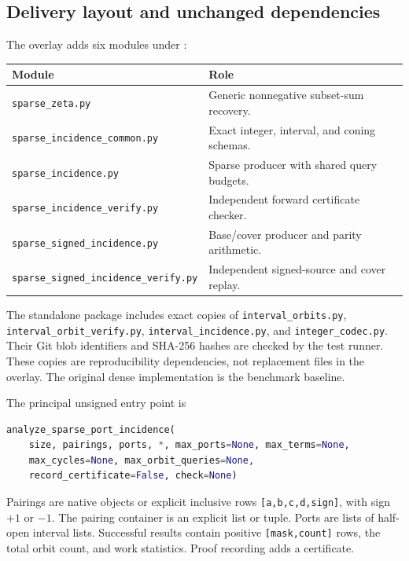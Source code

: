 \documentclass[11pt,letterpaper]{article}
\theoremstyle{definition}
\newcommand{\code}[1]{\texttt{#1}}
\begin{document}
\subsection{Delivery layout and unchanged dependencies}
The overlay adds six modules under :
\begin{center}
\begin{tabularx}{\textwidth}{@{}lX@{}}
\toprule
Module & Role \\
\midrule
\code{sparse\_zeta.py} & Generic nonnegative subset-sum recovery.\\
\code{sparse\_incidence\_common.py} & Exact integer, interval, and coning schemas.\\
\code{sparse\_incidence.py} & Sparse producer with shared query budgets.\\
\code{sparse\_incidence\_verify.py} & Independent forward certificate checker.\\
\code{sparse\_signed\_incidence.py} & Base/cover producer and parity arithmetic.\\
\code{sparse\_signed\_incidence\_verify.py} & Independent signed-source and cover replay.\\
\bottomrule
\end{tabularx}
\end{center}
The standalone package includes exact copies of \code{interval\_orbits.py}, \code{interval\_orbit\_verify.py},
\code{interval\_incidence.py}, and \code{integer\_codec.py}. Their Git blob
identifiers and SHA-256 hashes are checked by the test runner. These copies
are reproducibility dependencies, not replacement files in the overlay.
The original dense implementation is the benchmark baseline.

The principal unsigned entry point is
\begin{lstlisting}[language=Python]
analyze_sparse_port_incidence(
    size, pairings, ports, *, max_ports=None, max_terms=None,
    max_cycles=None, max_orbit_queries=None,
    record_certificate=False, check=None)
\end{lstlisting}
Pairings are native objects or explicit inclusive rows
\code{[a,b,c,d,sign]}, with sign $+1$ or $-1$. The pairing container is an
explicit list or tuple. Ports are lists of half-open interval lists.
Successful results contain positive \code{[mask,count]} rows, the total
orbit count, and work statistics. Proof recording adds a certificate.
\end{document}
